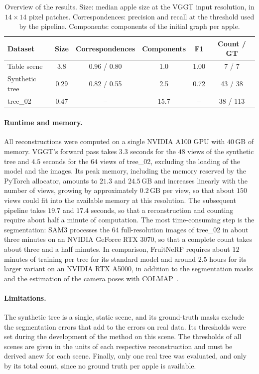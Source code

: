 \documentclass[english, egger, bsc]{vcethesis}
\begin{document}
\begin{table}[tbp]
    \centering
    \caption{Overview of the results. Size: median apple size at the
    VGGT input resolution, in $14 \times 14$ pixel patches.
    Correspondences: precision and recall at the threshold used by the
    pipeline. Components: components of the initial graph per apple.}
    \label{tab:results_overview}
    \small
    \begin{tabular}{lccccc}
        \toprule
        Dataset & Size & Correspondences & Components & F1
            & Count / GT \\
        \midrule
        Table scene    & 3.8  & 0.96 / 0.80 & 1.0  & 1.00 & 7 / 7 \\
        Synthetic tree & 0.29 & 0.82 / 0.55 & 2.5  & 0.72 & 43 / 38 \\
        tree\_02       & 0.47 & --          & 15.7 & --   & 38 / 113 \\
        \bottomrule
    \end{tabular}
\end{table}

\paragraph{Runtime and memory.}
All reconstructions were computed on a single NVIDIA A100 GPU with $40$\,GB of memory. VGGT's forward pass takes $3.3$ seconds for the $48$ views of the synthetic tree and $4.5$ seconds for the $64$ views of tree\_02, excluding the loading of the model and the images. Its peak memory, including the memory reserved by the PyTorch allocator, amounts to $21.3$ and $24.5$\,GB and increases linearly with the number of views, growing by approximately $0.2$\,GB per view, so that about $150$ views could fit into the available memory at this resolution. The subsequent pipeline takes $19.7$ and $17.4$ seconds, so that a reconstruction and counting require about half a minute of computation. The most time-consuming step is the segmentation: SAM3 processes the $64$ full-resolution images of tree\_02 in about three minutes on an NVIDIA GeForce RTX 3070, so that a complete count takes about three and a half minutes. In comparison, FruitNeRF requires about $12$ minutes of training per tree for its standard model and around $2.5$ hours for its larger variant on an NVIDIA RTX A5000, in addition to the segmentation masks and the estimation of the camera poses with COLMAP~\cite{meyer2024fruitnerf}.

\paragraph{Limitations.}
The synthetic tree is a single, static scene, and its ground-truth masks exclude the segmentation errors that add to the errors on real data. Its thresholds were set during the development of the method on this scene. The thresholds of all scenes are given in the units of each respective reconstruction and must be derived anew for each scene. Finally, only one real tree was evaluated, and only by its total count, since no ground truth per apple is available.
\end{document}
